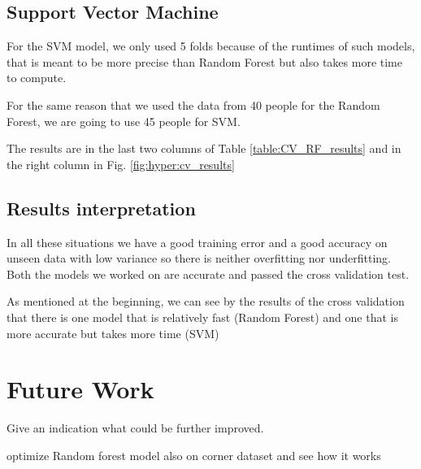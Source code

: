 \documentclass[conference]{IEEEtran}
\begin{document}
\subsection{Support Vector Machine}
\textcolor{baptiste}{For the SVM model, we only used 5 folds because of the runtimes of such models, that is meant to be more precise than Random Forest but also takes more time to compute.}

\textcolor{baptiste}{For the same reason that we used the data from 40 people for the Random Forest, we are going to use 45 people for SVM.
}

\textcolor{baptiste}{The results are in the last two columns of Table \ref{table:CV_RF_results} and in the right column in Fig. \ref{fig:hyper:cv_results}}

\subsection{Results interpretation}

\textcolor{baptiste}{In all these situations we have a good training error and a good accuracy on unseen data with low variance so there is neither overfitting nor underfitting. Both the models we worked on are accurate and passed the cross validation test.}

\textcolor{baptiste}{As mentioned at the beginning, we can see by the results of the cross validation that there is one model that is relatively fast (Random Forest) and one that is more accurate but takes more time (SVM)}

\section{Future Work}
Give an indication what could be further improved. 

optimize Random forest model also on corner dataset and see how it works


\end{document}
